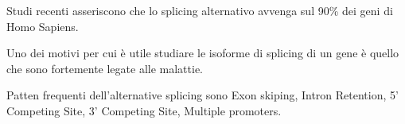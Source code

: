 Studi recenti asseriscono che lo splicing alternativo avvenga sul 90\% dei geni di Homo Sapiens.

Uno dei motivi per cui è utile studiare le isoforme di splicing di un gene è quello che sono fortemente legate alle malattie.

Patten frequenti dell'alternative splicing sono Exon skiping, Intron Retention, 5' Competing Site, 3' Competing Site, Multiple promoters.

